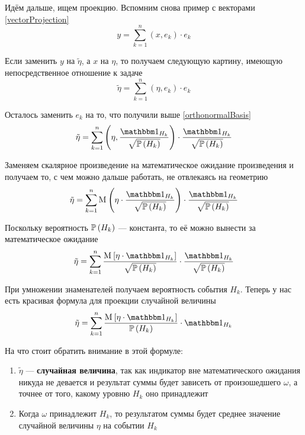 Идём дальше, ищем проекцию.
Вспомним снова пример с векторами \eqref{vectorProjection}
$$y = \sum_{k=1}^n \left( x, e_k \right) \cdot e_k$$

Если заменить $y$ на $\tilde{\eta}$, а $x$ на $\eta$,
то получаем следующую картину, имеющую непосредственное отношение к задаче
$$\tilde{\eta} = \sum_{k=1}^n \left( \eta, e_k \right) \cdot e_k$$

Осталось заменить $e_k$ на то, что получили выше \eqref{orthonormalBasis}
$$\tilde{\eta}
    = \sum_{k=1}^n
        \left( \eta, \frac{\indicatorof{H_k}}{\sqrt{\probability{H_k}}} \right) 
        \cdot \frac{\indicatorof{H_k}}{\sqrt{\probability{H_k}}}$$

Заменяем скалярное произведение на математическое ожидание произведения
и получаем то, с чем можно дальше работать, не отвлекаясь на геометрию
$$\tilde{\eta}
    = \sum_{k=1}^n
        \mean{\left( \eta
            \cdot \frac{\indicatorof{H_k}}{\sqrt{\probability{H_k}}} \right)}
        \cdot \frac{\indicatorof{H_k}}{\sqrt{\probability{H_k}}}$$

Поскольку вероятность $\mathbb{P}\left( H_k \right)$ --- константа,
то её можно вынести за математическое ожидание
$$\tilde{\eta}
    = \sum_{k=1}^n
        \frac{\Mean{ \eta \cdot \indicatorof{H_k} }}
            {\sqrt{\probability{H_k}}}
        \cdot \frac{\indicatorof{H_k}}{\sqrt{\probability{H_k}}}$$

При умножении знаменателей получаем вероятность события $H_k$.
Теперь у нас есть красивая формула для проекции случайной величины
\begin{equation}\label{discreteConditionalExpectation}
    \tilde{\eta} = \sum_{k=1}^n
        \frac{\Mean{\eta \cdot \indicatorof{H_k}}}{\probability{H_k}}
        \cdot \indicatorof{H_k}
\end{equation}

На что стоит обратить внимание в этой формуле:
\begin{enumerate}
    \item $\tilde{\eta}$ --- \textbf{случайная величина},
        так как индикатор вне математического ожидания никуда не девается
        и результат суммы будет зависеть от произошедшего $\omega$,
        а точнее от того, какому уровню $H_k$ оно принадлежит
    \item Когда $\omega$ принадлежит $H_k$,
        то результатом суммы будет среднее значение случайной величины $\eta$
        на событии $H_k$
\end{enumerate}

